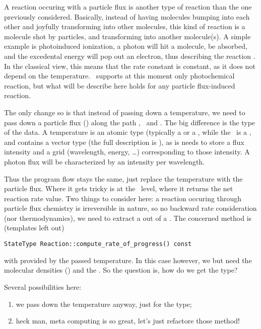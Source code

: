 A reaction occuring with a particle flux is another type of reaction than the one
previously considered. Basically, instead of having molecules bumping into each
other and joyfully transforming into other molecules, this kind of reaction is
a molecule shot by particles, and transforming into another molecule(s). A simple
example is photoinduced ionization, a photon will hit a molecule, be absorbed, and
the excedental energy will pop out an electron, thus describing the reaction
. In the classical view, this means that the rate constant
is constant, as it does not depend on the temperature. \Antioch\ supports at this
moment only photochemical reaction, but what will be describe here holds for any
particle flux-induced reaction.

The only change so is that instead of passing down a temperature,
we need to pass down a particle flux (\ParticleFlux) along the path
\KineticsEvaluator, \ReactionSet\ and \Reaction.
The big difference is the type of the data. A temperature is an atomic type (typically
a  or a , while the \ParticleFlux\ is a \ParticleFlux, and
contains a vector type (the full description is \ParticleFlux{}),
as is needs to store a flux intensity and a grid (wavelength, energy, \dots) corresponding
to those intensity. A photon flux will be characterized by an intensity per wavelength.

Thus the program flow stays the same, just replace the temperature with the particle
flux. Where it gets tricky is at the \Reaction\ level, where it returns the net reaction
rate value. Two things to consider here: a reaction occuring through particle flux
chemistry is irreversible in nature, so no backward rate consideration (nor thermodynamics),
we need to extract a  out of a \ParticleFlux{}.
The concerned method is (templates left out)
\begin{center}
\verb!StateType Reaction::compute_rate_of_progress() const!
\end{center}
with  provided by the passed temperature. In this case however, we but
need the molecular densities () and the \ParticleFlux. So the
question is, how do we get the  type?

Several possibilities here:
\begin{enumerate}
\item\label{type_pass} we pass down the temperature anyway, just for the type;
\item\label{meta_paradise} heck man, meta computing is so great, let's just refactore those method!
\end{enumerate}

